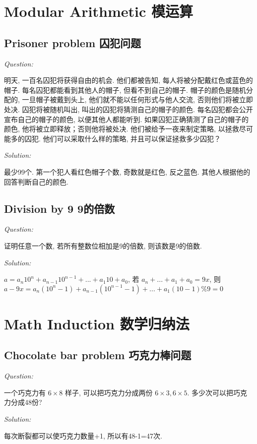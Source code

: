 \documentclass[12pt]{book}
\begin{document}
\section{Modular Arithmetic 模运算}
\subsection{Prisoner problem 囚犯问题}
\noindent \textit{Question:}

明天, 一百名囚犯将获得自由的机会. 他们都被告知, 每人将被分配戴红色或蓝色的帽子. 每名囚犯都能看到其他人的帽子, 但看不到自己的帽子. 帽子的颜色是随机分配的, 一旦帽子被戴到头上, 他们就不能以任何形式与他人交流, 否则他们将被立即处决. 囚犯将被随机叫出, 叫出的囚犯将猜测自己的帽子的颜色. 每名囚犯都会公开宣布自己的帽子的颜色, 以便其他人都能听到. 如果囚犯正确猜测了自己的帽子的颜色, 他将被立即释放；否则他将被处决. 他们被给予一夜来制定策略, 以拯救尽可能多的囚犯. 他们可以采取什么样的策略, 并且可以保证拯救多少囚犯？

\noindent \textit{Solution:} 

最少99个. 第一个犯人看红色帽子个数, 奇数就是红色, 反之蓝色. 其他人根据他的回答判断自己的颜色.


\subsection{Division by 9 9的倍数}
\noindent \textit{Question:}

证明任意一个数, 若所有整数位相加是9的倍数, 则该数是9的倍数.

\noindent \textit{Solution:} 

$a=a_n 10^n+a_{n-1} 10^{n-1}+...+a_1 10 +a_0 $, 若 $a_n+...+a_1+a_0=9x$, 则 $a-9x=a_n(10^n-1)+a_{n-1}(10^{n-1}-1)+...+a_1(10-1) \% 9 =0$


\section{Math Induction 数学归纳法}
\subsection{Chocolate bar problem 巧克力棒问题 }
\noindent \textit{Question:}

一个巧克力有 $6\times 8$ 样子, 可以把巧克力分成两份 $6\times 3, 6\times 5$. 多少次可以把巧克力分成48份?

\noindent \textit{Solution:} 

每次断裂都可以使巧克力数量+1, 所以有48-1=47次.
\end{document}
